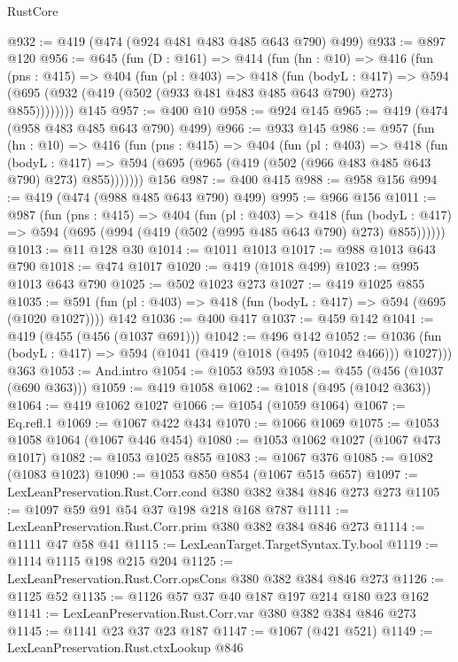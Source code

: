 \begin{lexlean}{RustCore}
\begin{coremodule}
@932 := @419 (@474 (@924 @481 @483 @485 @643 @790) @499)
@933 := @897 @120
@956 := @645
    (fun (D : @161) =>
    @414
      (fun (hn : @10) =>
      @416
        (fun (pns : @415) =>
        @404
          (fun (pl : @403) =>
          @418
            (fun (bodyL : @417) =>
            @594 (@695 (@932 (@419 (@502 (@933 @481 @483 @485 @643 @790) @273) @855))))))))
    @145
@957 := @400 @10
@958 := @924 @145
@965 := @419 (@474 (@958 @483 @485 @643 @790) @499)
@966 := @933 @145
@986 := @957
    (fun (hn : @10) =>
    @416
      (fun (pns : @415) =>
      @404
        (fun (pl : @403) =>
        @418
          (fun (bodyL : @417) =>
          @594 (@695 (@965 (@419 (@502 (@966 @483 @485 @643 @790) @273) @855)))))))
    @156
@987 := @400 @415
@988 := @958 @156
@994 := @419 (@474 (@988 @485 @643 @790) @499)
@995 := @966 @156
@1011 := @987
    (fun (pns : @415) =>
    @404
      (fun (pl : @403) =>
      @418
        (fun (bodyL : @417) => @594 (@695 (@994 (@419 (@502 (@995 @485 @643 @790) @273) @855))))))
@1013 := @11 @128 @30
@1014 := @1011 @1013
@1017 := @988 @1013 @643 @790
@1018 := @474 @1017
@1020 := @419 (@1018 @499)
@1023 := @995 @1013 @643 @790
@1025 := @502 @1023 @273
@1027 := @419 @1025 @855
@1035 := @591 (fun (pl : @403) => @418 (fun (bodyL : @417) => @594 (@695 (@1020 @1027)))) @142
@1036 := @400 @417
@1037 := @459 @142
@1041 := @419 (@455 (@456 (@1037 @691)))
@1042 := @496 @142
@1052 := @1036 (fun (bodyL : @417) => @594 (@1041 (@419 (@1018 (@495 (@1042 @466))) @1027))) @363
@1053 := And.intro
@1054 := @1053 @593
@1058 := @455 (@456 (@1037 (@690 @363)))
@1059 := @419 @1058
@1062 := @1018 (@495 (@1042 @363))
@1064 := @419 @1062 @1027
@1066 := @1054 (@1059 @1064)
@1067 := Eq.refl.{1}
@1069 := @1067 @422 @434
@1070 := @1066 @1069
@1075 := @1053 @1058 @1064 (@1067 @446 @454)
@1080 := @1053 @1062 @1027 (@1067 @473 @1017)
@1082 := @1053 @1025 @855
@1083 := @1067 @376
@1085 := @1082 (@1083 @1023)
@1090 := @1053 @850 @854 (@1067 @515 @657)
@1097 := LexLeanPreservation.Rust.Corr.cond @380 @382 @384 @846 @273 @273
@1105 := @1097 @59 @91 @54 @37 @198 @218 @168 @787
@1111 := LexLeanPreservation.Rust.Corr.prim @380 @382 @384 @846 @273
@1114 := @1111 @47 @58 @41
@1115 := LexLeanTarget.TargetSyntax.Ty.bool
@1119 := @1114 @1115 @198 @215 @204
@1125 := LexLeanPreservation.Rust.Corr.opsCons @380 @382 @384 @846 @273
@1126 := @1125 @52
@1135 := @1126 @57 @37 @40 @187 @197 @214 @180 @23 @162
@1141 := LexLeanPreservation.Rust.Corr.var @380 @382 @384 @846 @273
@1145 := @1141 @23 @37 @23 @187
@1147 := @1067 (@421 @521)
@1149 := LexLeanPreservation.Rust.ctxLookup @846

\end{coremodule}
\end{lexlean}
